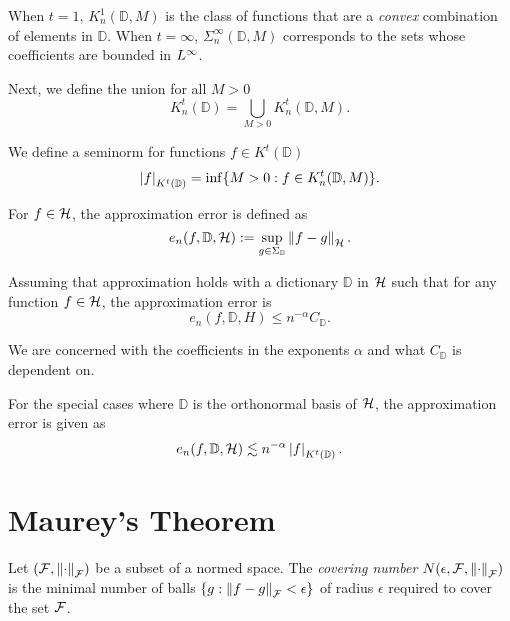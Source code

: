 When $t = 1$, $K^1_n(\mathbb{D}, M)$ is the class of functions that are a
\textit{convex} combination of elements in $\mathbb{D}$. When $t = \infty$,
$\Sigma^{\infty}_n(\mathbb{D}, M)$ corresponds to the sets whose coefficients
are bounded in $L^{\infty}$. 

Next, we define the union for all $M > 0$
\begin{equation}
    K^t_n(\mathbb{D}) = \bigcup_{M > 0} K^t_n(\mathbb{D}, M).
\end{equation}

We define a seminorm for functions $f \in K^t(\mathbb{D})$
\begin{equation}
    \label{eq:general_seminorm}
    \left| f \right|_{K^t(\mathbb{D})} = \inf \{
        M >0: f \in K^t_n(\mathbb{D}, M)
    \}.
\end{equation}

For $f \in \mathcal{H}$, the approximation error is defined as
\begin{equation}
    \label{eq:appro_err_hilbert}
    e_n(f, \mathbb{D}, \mathcal{H})
        := \sup_{g\in\Sigma_{\mathbb{D}}} \left\| f - g \right\|_{\mathcal{H}}.
\end{equation}

Assuming that approximation holds with a dictionary $\mathbb{D}$ in $\mathcal{H}$
such that for any function $f \in \mathcal{H}$, the approximation error is
\begin{equation}
    \label{eq:appro_error_general}
    e_n(f, \mathbb{D}, H) \leq n^{-\alpha} C_{\mathbb{D}}.
\end{equation}

We are concerned with the coefficients in the exponents $\alpha$ and what
$C_{\mathbb{D}}$ is dependent on.

For the special cases where $\mathbb{D}$ is the orthonormal basis of $\mathcal{H}$,
the approximation error is given as
\begin{equation}
    \label{eq:appro_error_ortho}
    e_n(f, \mathbb{D}, \mathcal{H}) 
        \lesssim n^{-\alpha} \left| f \right|_{K^t(\mathbb{D})}.
\end{equation}

\section{Maurey's Theorem}
\label{sec:maurey}

\begin{definition}
    \label{def:covering_num}
    Let $(\mathcal{F}, \left\| \cdot \right\|_{\mathcal{F}})$ be a subset of a normed space. The
    \textit{covering number} $N(\epsilon, \mathcal{F}, \left\| \cdot \right\|_{\mathcal{F}})$ is
    the minimal number of balls $\{g: \left\| f - g \right\|_{\mathcal{F}} < \epsilon\}$ of
    radius $\epsilon$ required to cover the set $\mathcal{F}$. 
\end{definition}

